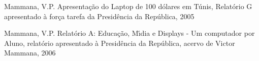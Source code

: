 \documentclass[
12pt,		%
openright,	%
twoside,  %
a4paper,			%
chapter=TITLE,		%
english,			%
french,				%
spanish,			%
brazil				%
]{USPSC-classe/USPSC}
\begin{document}
\begin{flushleft}
\begin{flushleft}
\begin{flushleft}
\begin{flushleft}
\begin{flushleft}
\begin{flushleft}
\begin{flushleft}
\begin{flushleft}
\begin{flushleft}
[MAMMANA, 2005] Mammana, V.P. Apresenta\c{c}\~ao do Laptop de 100 d\'olares em T\'unis, Relat\'orio G apresentado \`a for\c{c}a tarefa da Presid\^encia da Rep\'ublica, 2005
\end{flushleft}


\end{flushleft}


\end{flushleft}


\end{flushleft}


\end{flushleft}


\end{flushleft}


\end{flushleft}


\end{flushleft}


\end{flushleft}


\begin{flushleft}
\begin{flushleft}
\begin{flushleft}
\begin{flushleft}
\begin{flushleft}
\begin{flushleft}
\begin{flushleft}
\begin{flushleft}
\begin{flushleft}
[MAMMANA, 2006] Mammana, V.P. Relat\'orio A: Educa\c{c}\~ao, M\'{\i}dia e Displays - Um computador por Aluno, relat\'orio apresentado \`a Presid\^encia da Rep\'ublica, acervo de Victor Mammana, 2006
\end{flushleft}


\end{flushleft}


\end{flushleft}


\end{flushleft}


\end{flushleft}


\end{flushleft}


\end{flushleft}


\end{flushleft}


\end{flushleft}
\end{document}
